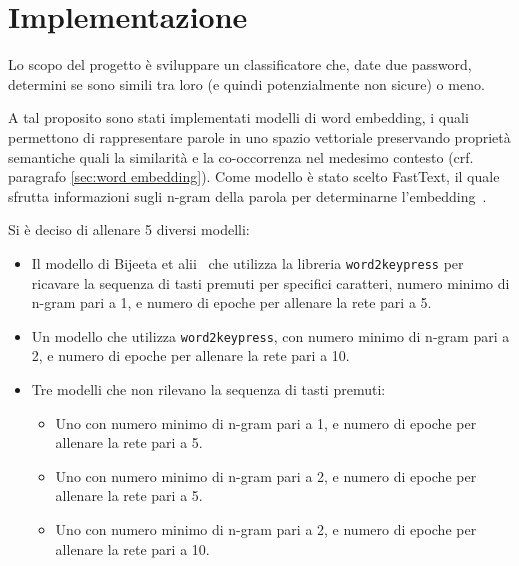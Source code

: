 \chapter{Implementazione}
\label{ch:implementazione}

Lo scopo del progetto è sviluppare un classificatore che, date due password, determini se sono simili tra loro (e quindi potenzialmente non sicure) o meno.

A tal proposito sono stati implementati modelli di word embedding, i quali permettono di rappresentare parole in uno spazio vettoriale preservando proprietà semantiche quali la similarità e la co-occorrenza nel medesimo contesto (crf. paragrafo \ref{sec:word embedding}).
Come modello è stato scelto FastText, il quale sfrutta informazioni sugli n-gram della parola per determinarne l'embedding~\cite{bijeeta}.

Si è deciso di allenare 5 diversi modelli:
\begin{itemize}
    \item Il modello di Bijeeta et alii~\cite{bijeeta} che utilizza la libreria \texttt{word2keypress} per ricavare la sequenza di tasti premuti per specifici caratteri, numero minimo di n-gram pari a 1, e numero di epoche per allenare la rete pari a 5.
    \item Un modello che utilizza \texttt{word2keypress}, con numero minimo di n-gram pari a 2, e numero di epoche per allenare la rete pari a 10.
    \item Tre modelli che non rilevano la sequenza di tasti premuti:
    \begin{itemize}
        \item Uno con numero minimo di n-gram pari a 1, e numero di epoche per allenare la rete pari a 5.
        \item Uno con numero minimo di n-gram pari a 2, e numero di epoche per allenare la rete pari a 5.
        \item Uno con numero minimo di n-gram pari a 2, e numero di epoche per allenare la rete pari a 10.
    \end{itemize}
\end{itemize}

